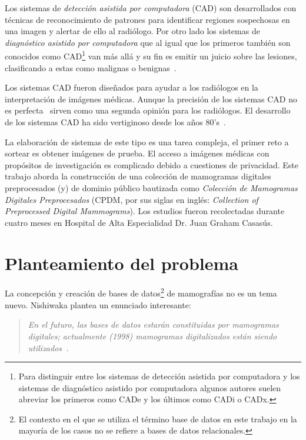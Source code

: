 Los sistemas de \textit{detección asistida por computadora} (CAD) son
desarrollados con técnicas de reconocimiento de patrones para identificar
regiones sospechosas en una imagen y alertar de ello al radiólogo. Por otro
lado los sistemas de \textit{diagnóstico asistido por computadora} que al igual
que los primeros también son conocidos como CAD\footnote{Para distinguir entre
los sistemas de detección asistida por computadora y los sistemas de
diagnóstico asistido por computadora algunos autores suelen abreviar los
primeros como CADe y los últimos como CADi o CADx.} van más allá y su fin es
emitir un juicio sobre las lesiones, clasificando a estas como malignas o
benignas~\cite{castellino2005computer}.

Los sistemas CAD fueron diseñados para ayudar a los radiólogos en la
interpretación de imágenes médicas. Aunque la precisión de los sistemas CAD no
es perfecta~\cite{fenton2007influence} sirven como una segunda opinión para los
radiólogos. El desarrollo de los sistemas CAD ha sido vertiginoso desde los
años 80's~\cite{giger2008anniversary}.

La elaboración de sistemas de este tipo es una tarea compleja, el primer reto a
sortear es obtener imágenes de prueba. El acceso a imágenes médicas con
propósitos de investigación es complicado debido a cuestiones de privacidad.
Este trabajo aborda la construcción de una colección de mamogramas digitales
preprocesados (y) de dominio público bautizada como \textit{Colección de
Mamogramas Digitales Preprocesados} (CPDM, por sus siglas en inglés:
\textit{Collection of Preprocessed Digital Mammograms}). Los estudios fueron
recolectadas durante cuatro meses en Hospital de Alta Especialidad Dr. Juan
Graham Casasús.

\section{Planteamiento del problema}

La concepción y creación de bases de datos\footnote{El contexto en el que se
utiliza el término base de datos en este trabajo en la mayoría de los casos no
se refiere a bases de datos relacionales.} de mamografías no es un tema nuevo.
Nishiwaka plantea un enunciado interesante:

\begin{quotation}
\em En el futuro, las bases de datos estarán constituidas por mamogramas digitales;
actualmente (1998) mamogramas digitalizados están siendo
utilizados~\cite{nishikawa1998mammographic}.
\end{quotation}

